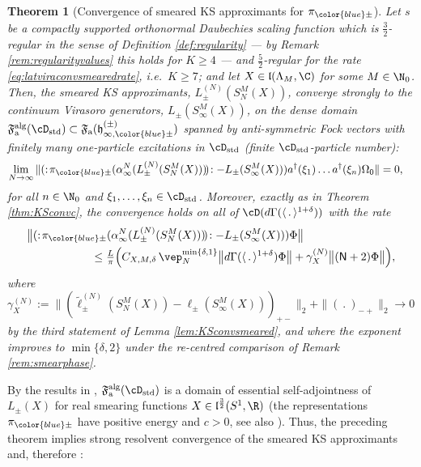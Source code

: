 \documentclass[a4paper, 11pt]{article}
\newcommand{\ua}{\textup a}
\newcommand{\fF}{\mathfrak{F}}\newcommand{\cF}{\mathcal{F}}\newcommand{\dF}{\mathds{F}}\newcommand{\sF}{\mathscr{F}}
\newcommand{\fh}{\mathfrak{h}}
\newcommand{\fl}{\mathfrak{l}}\newcommand{\cl}{\mathcal{l}}
\DeclareMathOperator{\1}{\mathds{1}}
\DeclareMathOperator{\std}{std}
\DeclareMathOperator{\alg}{alg}
\newtheorem{thm}{Theorem} [section]
\newcommand{\Nop}{\mathsf{N}}
\begin{document}
\begin{thm}[Convergence of smeared KS approximants for $\pi_{{\color{blue}\pm}}$]
\label{thm:KSconvsmeared}
Let $s$ be a compactly supported orthonormal Daubechies scaling function which is $\tfrac{3}{2}$-regular in the sense of Definition \ref{def:regularity} --- by Remark \ref{rem:regularityvalues} this holds for $K\geq4$ --- and $\tfrac{5}{2}$-regular for the rate \eqref{eq:latviraconvsmearedrate}, i.e.~$K\geq7$; and let $X\in\fl(\Lambda_{M},\C)$ for some $M\in\N_{0}$. Then, the smeared KS approximants, $L^{(N)}_{\pm}(S^{M}_{N}(X))$, converge strongly to the continuum Virasoro generators, $L_{\pm}(S^{M}_{\infty}(X))$, on the dense domain $\fF^{\alg}_{\ua}(\cD_{\std})\subset\fF_{\ua}(\fh^{(\pm)}_{\infty,{\color{blue}\pm}})$ spanned by anti-symmetric Fock vectors with finitely many one-particle excitations in $\cD_{\std}$ (finite $\cD_{\std}$-particle number):
\begin{align}
\label{eq:latviraconvsmeared}
\lim_{N\rightarrow\infty}\|(:\!\pi_{{\color{blue}\pm}}(\alpha^{N}_{\infty}(L^{(N)}_{\pm}(S^{M}_{N}(X)))\!)\!: - L_{\pm}(S^{M}_{\infty}(X)))a^{\dagger}(\xi_{1})\dots a^{\dagger}(\xi_{n})\Omega_{0}\| & = 0,
\end{align}
for all $n\in\N_{0}$ and $\xi_{1},\dots,\xi_{n}\in\cD_{\std}$. Moreover, exactly as in Theorem \ref{thm:KSconvc}, the convergence holds on all of $\cD(d\Gamma(\langle\!\ .\!\ \rangle^{1+\delta}))$ with the rate
\begin{align}
\label{eq:latviraconvsmearedrate}
& \big\|(:\!\pi_{{\color{blue}\pm}}(\alpha^{N}_{\infty}(L^{(N)}_{\pm}(S^{M}_{N}(X)))\!)\!: - L_{\pm}(S^{M}_{\infty}(X)))\Phi\big\| \\ \nonumber
& \hspace{2cm} \leq \tfrac{L}{\pi}\Big(C_{X,M,\delta}\!\ \vep_{N}^{\min\{\delta,1\}}\big\|d\Gamma(\langle\!\ .\!\ \rangle^{1+\delta})\Phi\big\| + \gamma^{(N)}_{X}\big\|(\Nop+2)\Phi\big\|\Big),
\end{align}
where $\gamma^{(N)}_{X}:=\|(\tilde{\ell}^{(N)}_{\pm}(S^{M}_{N}(X))-\ell_{\pm}(S^{M}_{\infty}(X)))_{+-}\|_{2}+\|(\!\ .\!\ )_{-+}\|_{2}\rightarrow0$ by the third statement of Lemma \ref{lem:KSconvsmeared}, and where the exponent improves to $\min\{\delta,2\}$ under the re-centred comparison of Remark \ref{rem:smearphase}.
\end{thm}
By the results in \cite{CarpiOnTheUniqueness}, $\fF^{\alg}_{\ua}(\cD_{\std})$ is a domain of essential self-adjointness of $L_{\pm}(X)$ for real smearing functions $X\in\fl^{\frac{3}{2}}(S^{1},\R)$ (the representations $\pi_{{\color{blue}\pm}}$ have positive energy and $c>0$, see also \cite{GoodmanProjectiveUnitaryPositive}). Thus, the preceding theorem implies strong resolvent convergence of the smeared KS approximants and, therefore \cite{ReedMethodsOfModern1}:
\end{document}
